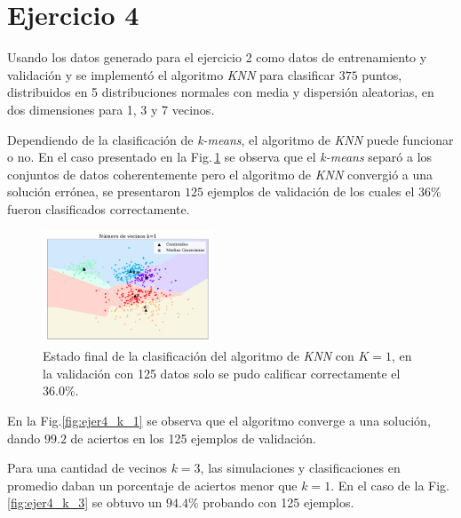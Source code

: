     \section*{Ejercicio 4}

    Usando los datos generado para el ejercicio  2 como datos de entrenamiento  y  validación y se implementó el algoritmo \emph{KNN} para clasificar $375$ puntos,   distribuidos en  5 distribuciones normales  con media y dispersión aleatorias, en dos dimensiones para 1, 3 y 7 vecinos. 


    Dependiendo de la clasificación de \emph{k-means}, el algoritmo de \emph{KNN} puede funcionar o no. En el caso presentado en la Fig.\,\ref{fig:ejer4_k_1_malo} se observa que el \emph{k-means} separó a los conjuntos de datos coherentemente pero el algoritmo de \emph{KNN} convergió a  una solución errónea, se presentaron $125$ ejemplos de validación de los cuales el $36\%$ fueron clasificados correctamente.

    \begin{figure}[H]
    \centering
    \includegraphics[width=0.45\textwidth]{plots/ejer_4_K-1_no_coverge.pdf}
    \caption{Estado final de la clasificación del algoritmo de \emph{KNN} con $K=1$, en la validación con 125 datos solo se pudo calificar correctamente el 36.0\%.}
    \label{fig:ejer4_k_1_malo}
    \end{figure}

    En la Fig.\ref{fig:ejer4_k_1} se observa que el algoritmo converge a una solución, dando $99.2$ de aciertos en los 125 ejemplos de validación.


    Para una cantidad de vecinos $k=3$, las  simulaciones y clasificaciones en promedio daban un porcentaje de aciertos menor que $k=1$. En el caso de la Fig.\,\ref{fig:ejer4_k_3} se obtuvo un $94.4\%$ probando con 125 ejemplos. 

